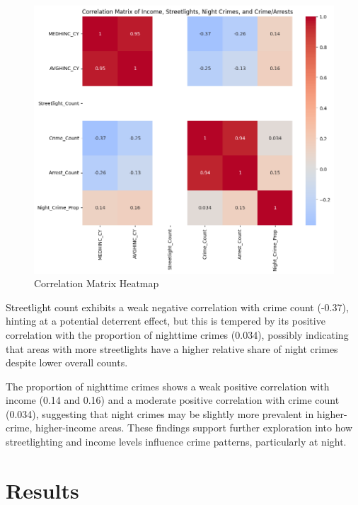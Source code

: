 \documentclass{report}
\begin{document}
    
   \begin{figure}[h]
    	\begin{center}
    		\advance\leftskip-3cm
    		\advance\rightskip-3cm
    		\includegraphics[keepaspectratio=true,scale=.6]{heatmap}
    		\caption{Correlation Matrix Heatmap}
    		\label{fig:heatmap}
    	\end{center}
    \end{figure}
    
    
    \par Streetlight count exhibits a weak negative correlation with crime count (-0.37), hinting at a potential deterrent effect, but this is tempered by its positive correlation with the proportion of nighttime crimes (0.034), possibly indicating that areas with more streetlights have a higher relative share of night crimes despite lower overall counts. 
    
    The proportion of nighttime crimes shows a weak positive correlation with income (0.14 and 0.16) and a moderate positive correlation with crime count (0.034), suggesting that night crimes may be slightly more prevalent in higher-crime, higher-income areas. These findings support further exploration into how streetlighting and income levels influence crime patterns, particularly at night.
    
    \chapter{Results}
    
\end{document}
